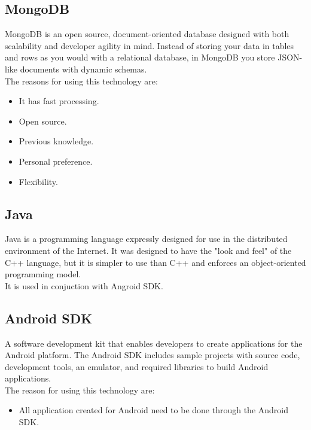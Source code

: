 \subsection{MongoDB}
MongoDB is an open source, document-oriented database designed with both scalability and developer agility in mind. Instead of storing your data in tables and rows as you would with a relational database, in MongoDB you store JSON-like documents with dynamic schemas.
\\The reasons for using this technology are:
\begin{itemize}
\item It has fast processing.
\item Open source.
\item Previous knowledge.
\item Personal preference.
\item Flexibility.
\end{itemize}



\subsection{Java}
Java is a programming language expressly designed for use in the distributed environment of the Internet. It was designed to have the "look and feel" of the C++ language, but it is simpler to use than C++ and enforces an object-oriented programming model.
\\It is used in conjuction with Angroid SDK.


\subsection{Android SDK}
A software development kit that enables developers to create applications for the Android platform. The Android SDK includes sample projects with source code, development tools, an emulator, and required libraries to build Android applications.
\\The reason for using this technology are:
\begin{itemize}
\item All application created for Android need to be done through the Android SDK.
\end{itemize}

